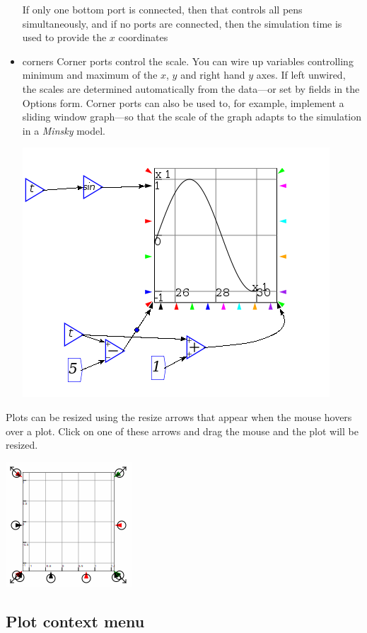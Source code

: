 \begin{itemize}
If only one bottom port is connected, then that controls all pens
simultaneously, and if no ports are connected, then the simulation
time is used to provide the $x$ coordinates 
\item corners Corner ports control the scale. You can wire up variables
controlling minimum and maximum of the $x$, $y$ and right hand $y$
axes. If left unwired, the scales are determined automatically from
the data---or set by fields in the Options form. Corner ports can
also be used to, for example, implement a sliding window graph---so
that the scale of the graph adapts to the simulation in a \emph{Minsky}
model.
\begin{center}
\includegraphics{images/plotSlidingWindow} 
\par\end{center}

\end{itemize}
Plots can be resized using the resize arrows that appear when the
mouse hovers over a plot. Click on one of these arrows and drag the
mouse and the plot will be resized.

\includegraphics{images/plotResize}

\subsection{Plot context menu}

